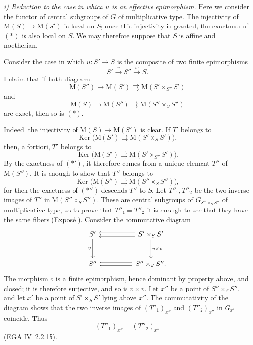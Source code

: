 \textit{i) Reduction to the case in which \(u\) is an effective
epimorphism.}\quad
Here we consider the functor of central subgroups of \(G\) of
multiplicative type. The injectivity of
\(\mathrm M(S)\to\mathrm M(S')\) is local on \(S\); once this
injectivity is granted, the exactness of \((*)\) is also local on
\(S\). We may therefore suppose that \(S\) is affine and
noetherian.

Consider the case in which \(u:S'\to S\) is the composite of two
finite epimorphisms
\[
  S'\xrightarrow{v}S''\xrightarrow{w}S.
\]
I claim that if both diagrams
\[
  \tag{*'}\label{sga3:xv:lemma:3-7:equation:star-prime}
  \mathrm M(S'')\longrightarrow\mathrm M(S')
  \rightrightarrows\mathrm M(S'\times_{S''}S')
\]
and
\[
  \tag{*''}\label{sga3:xv:lemma:3-7:equation:star-prime-prime}
  \mathrm M(S)\longrightarrow\mathrm M(S'')
  \rightrightarrows\mathrm M(S''\times_S S'')
\]
are exact, then so is \((*)\).

Indeed, the injectivity of
\(\mathrm M(S)\to\mathrm M(S')\) is clear. If \(T'\) belongs to
\[
  \operatorname{Ker}\bigl(
    \mathrm M(S')\rightrightarrows
    \mathrm M(S'\times_S S')\bigr),
\]
then, a fortiori, \(T'\) belongs to
\[
  \operatorname{Ker}\bigl(
    \mathrm M(S')\rightrightarrows
    \mathrm M(S'\times_{S''}S')\bigr).
\]
By the exactness of \((*')\), it therefore comes from a unique
element \(T''\) of \(\mathrm M(S'')\). It is enough to show that
\(T''\) belongs to
\[
  \operatorname{Ker}\bigl(
    \mathrm M(S'')\rightrightarrows
    \mathrm M(S''\times_S S'')\bigr),
\]
for then the exactness of \((*'')\) descends \(T''\) to \(S\).
Let \(T''_1,T''_2\) be the two inverse images of \(T''\) in
\(\mathrm M(S''\times_S S'')\). These are central subgroups of
\(G_{S''\times_S S''}\) of multiplicative type, so to prove that
\(T''_1=T''_2\) it is enough to see that they have the same fibers
(Exposé ). Consider the commutative diagram
\[
\begin{tikzcd}[column sep=huge,row sep=large]
S' \arrow[d,"v"'] &
  S'\times_S S' \arrow[l,shift left=.55ex]
    \arrow[l,shift right=.55ex] \arrow[d,"v\times v"]\\
S'' &
  S''\times_S S'' . \arrow[l,shift left=.55ex]
    \arrow[l,shift right=.55ex]
\end{tikzcd}
\]
The morphism \(v\) is a finite epimorphism, hence dominant by
property \textup{} above, and closed; it is therefore surjective,
and so is \(v\times v\). Let \(x''\) be a point of
\(S''\times_S S''\), and let \(x'\) be a point of
\(S'\times_S S'\) lying above \(x''\). The commutativity of the
diagram shows that the two inverse images of
\((T''_1)_{x''}\) and \((T''_2)_{x''}\) in \(G_{x'}\) coincide.
Thus
\[
  (T''_1)_{x''}=(T''_2)_{x''}
\]
(EGA IV~2.2.15).


